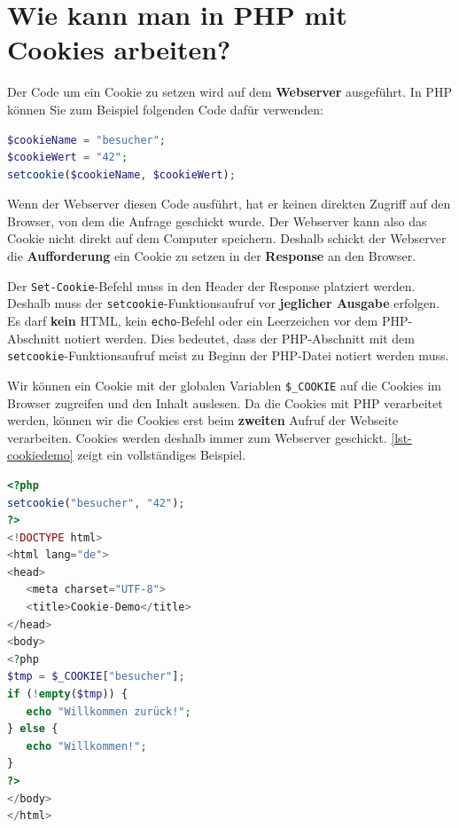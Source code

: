 \section{Wie kann man in \acs{PHP} mit Cookies arbeiten?}

Der Code um ein Cookie zu setzen wird auf dem \textbf{Webserver} ausgeführt. In \ac{PHP} können Sie zum Beispiel folgenden Code dafür verwenden:

\begin{lstlisting}[language=PHP, caption={Beispiele für das Setzen eines Cookies.}, label={lst-set-cookie-example}]
$cookieName = "besucher";
$cookieWert = "42";
setcookie($cookieName, $cookieWert);
\end{lstlisting}

Wenn der Webserver diesen Code ausführt, hat er keinen direkten Zugriff auf den Browser, von dem die Anfrage geschickt wurde. Der Webserver kann also das Cookie nicht direkt auf dem Computer speichern. Deshalb schickt der Webserver die \textbf{Aufforderung} ein Cookie zu setzen in der \textbf{Response} an den Browser.

\begin{important}
Der \texttt{Set-Cookie}-Befehl muss in den Header der Response platziert werden. Deshalb muss der \lstinline{setcookie}-Funktionsaufruf vor \textbf{jeglicher Ausgabe} erfolgen. Es darf \textbf{kein} \ac{HTML}, kein \lstinline{echo}-Befehl oder ein Leerzeichen vor dem \ac{PHP}-Abschnitt notiert werden. Dies bedeutet, dass der \ac{PHP}-Abschnitt mit dem \lstinline{setcookie}-Funktionsaufruf meist zu Beginn der \ac{PHP}-Datei notiert werden muss.
\end{important}

Wir können ein Cookie mit der globalen Variablen \lstinline{$_COOKIE} auf die Cookies im Browser zugreifen und den Inhalt auslesen. Da die Cookies mit \ac{PHP} verarbeitet werden, können wir die Cookies erst beim \textbf{zweiten} Aufruf der Webseite verarbeiten. Cookies werden deshalb immer zum Webserver geschickt. \autoref{lst-cookiedemo} zeigt ein vollständiges Beispiel.

\newpage

\begin{lstlisting}[language=PHP, alsolanguage=HTML, caption={\texttt{cookie\_demo.php}.}, label={lst-cookiedemo}]
<?php
setcookie("besucher", "42");
?>
<!DOCTYPE html>
<html lang="de">
<head>
   <meta charset="UTF-8">
   <title>Cookie-Demo</title>
</head>
<body>
<?php
$tmp = $_COOKIE["besucher"];
if (!empty($tmp)) {
   echo "Willkommen zurück!";
} else {
   echo "Willkommen!";
}
?>
</body>
</html>
\end{lstlisting}

